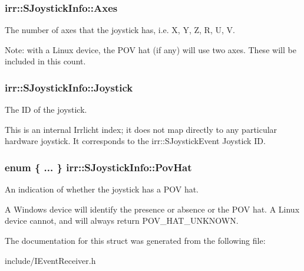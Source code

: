 \subsubsection[{\texorpdfstring{Axes}{Axes}}]{ irr\+::\+S\+Joystick\+Info\+::\+Axes}\hypertarget{structirr_1_1SJoystickInfo_a0a09d1c3fc664207abaa610e5896b0c5}{}\label{structirr_1_1SJoystickInfo_a0a09d1c3fc664207abaa610e5896b0c5}


The number of axes that the joystick has, i.\+e. X, Y, Z, R, U, V. 

Note\+: with a Linux device, the P\+OV hat (if any) will use two axes. These will be included in this count. 
\subsubsection[{\texorpdfstring{Joystick}{Joystick}}]{ irr\+::\+S\+Joystick\+Info\+::\+Joystick}\hypertarget{structirr_1_1SJoystickInfo_a691ed1bcdbf4ab3b30a4e9ed648c6d9d}{}\label{structirr_1_1SJoystickInfo_a691ed1bcdbf4ab3b30a4e9ed648c6d9d}


The ID of the joystick. 

This is an internal Irrlicht index; it does not map directly to any particular hardware joystick. It corresponds to the irr\+::\+S\+Joystick\+Event Joystick ID. 
\subsubsection[{\texorpdfstring{Pov\+Hat}{PovHat}}]{\setlength{\rightskip}{0pt plus 5cm}enum \{ ... \}   irr\+::\+S\+Joystick\+Info\+::\+Pov\+Hat}\hypertarget{structirr_1_1SJoystickInfo_a2abf9d4741731c29fe4d9d64f7909d1e}{}\label{structirr_1_1SJoystickInfo_a2abf9d4741731c29fe4d9d64f7909d1e}


An indication of whether the joystick has a P\+OV hat. 

A Windows device will identify the presence or absence or the P\+OV hat. A Linux device cannot, and will always return P\+O\+V\+\_\+\+H\+A\+T\+\_\+\+U\+N\+K\+N\+O\+WN. 

The documentation for this struct was generated from the following file\+:\begin{DoxyCompactItemize}
\item 
include/I\+Event\+Receiver.\+h\end{DoxyCompactItemize}
